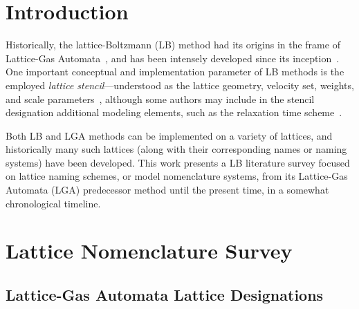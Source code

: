 \section{Introduction}

    Historically,   the   lattice-Boltzmann   (LB)    method    had    its    origins    in    the    frame    of    Lattice-Gas
    Automata~\cite{1988-McNamaraGR+ZanettiG-PhysRevLett},     and     has     been     intensely     developed     since     its
    inception~\cite{1992-BenziR+VergassolaM-PhysRep,       1998-ChenS+DoolenGD-AnnuRevFluidMech,        2011-MohamadAA-Springer,
    2018-KrugerT+ViggenEM-Springer}. One important conceptual and  implementation  parameter  of  LB  methods  is  the  employed
    \emph{lattice    stencil}---understood    as    the    lattice    geometry,    velocity    set,    weights,    and     scale
    parameters~\cite{2013-HegeleJr+PhilippiPC-JSciComput,                                2013-MattilaKK+PhilippiPC-IntJModPhysC,
    2014-MattilaKK+PhilippiPC-SciWorldJ}, although some authors may include  in  the  stencil  designation  additional  modeling
    elements, such as the relaxation time scheme~\cite{2017-LiL+KlausnerJF-IntJHeatMassTran}.

    Both LB and LGA methods can be implemented on a variety of lattices, and historically many such lattices (along  with  their
    corresponding names or naming systems) have been developed. This work presents a LB literature  survey  focused  on  lattice
    naming schemes, or model nomenclature systems, from its Lattice-Gas Automata (LGA)  predecessor  method  until  the  present
    time, in a somewhat chronological timeline.



\section{Lattice Nomenclature Survey}

    \subsection{Lattice-Gas Automata Lattice Designations}

